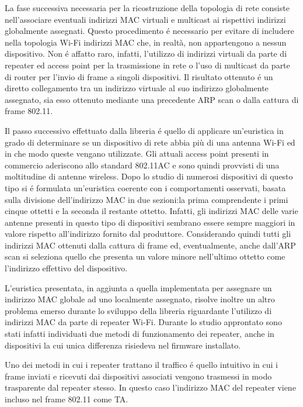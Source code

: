 La fase successiva necessaria per la ricostruzione della topologia di rete consiste nell'associare eventuali indirizzi MAC virtuali e multicast ai rispettivi indirizzi globalmente assegnati.
Questo procedimento \'e necessario per evitare di includere nella topologia Wi-Fi indirizzi MAC che, in realt\`a, non appartengono a nessun dispositivo.
Non \'e affatto raro, infatti, l'utilizzo di indirizzi virtuali da parte di repeater ed access point per la trasmissione in rete o l'uso di multicast da parte di router per l'invio di frame a singoli dispositivi.
Il risultato ottenuto \'e un diretto collegamento tra un indirizzo virtuale al suo indirizzo globalmente assegnato, sia esso ottenuto mediante una precedente ARP scan o dalla cattura di frame 802.11.

Il passo successivo effettuato dalla libreria \'e quello di applicare un'euristica in grado di determinare se un dispositivo di rete abbia pi\`u di una antenna Wi-Fi ed in che modo queste vengano utilizzate.
Gli attuali access point presenti in commercio aderiscono allo standard 802.11AC e sono quindi provvisti di una moltitudine di antenne wireless.
Dopo lo studio di numerosi dispositivi di questo tipo si \'e formulata un'euristica coerente con i comportamenti osservati, basata sulla divisione dell'indirizzo MAC in due sezioni:la prima comprendente i primi cinque ottetti e la seconda il restante ottetto.
Infatti, gli indirizzi MAC delle varie antenne presenti in questo tipo di dispositivi sembrano essere sempre maggiori in valore rispetto all'indirizzo fornito dal produttore.
Considerando quindi tutti gli indirizzi MAC ottenuti dalla cattura di frame ed, eventualmente, anche dall'ARP scan si seleziona quello che presenta un valore minore nell'ultimo ottetto come l'indirizzo effettivo del dispositivo.

L'euristica presentata, in aggiunta a quella implementata per assegnare un indirizzo MAC globale ad uno localmente assegnato, risolve inoltre un altro problema emerso durante lo sviluppo della libreria riguardante l'utilizzo di indirizzi MAC da parte di repeater Wi-Fi.
Durante lo studio approntato sono stati infatti individuati due metodi di funzionamento dei repeater, anche in dispositivi la cui unica differenza risiedeva nel firmware installato.

Uno dei metodi in cui i repeater trattano il traffico \'e quello intuitivo in cui i frame inviati e ricevuti dai dispositivi associati vengono trasmessi in modo trasparente dal repeater stesso.
In questo caso l'indirizzo MAC del repeater viene incluso nel frame 802.11 come TA.

